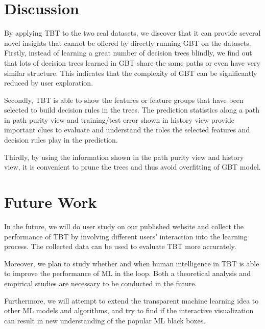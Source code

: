 \documentclass{chi2009}
\begin{document}
\section{Discussion}

By applying TBT to the two real datasets, we discover that it can provide several novel insights that cannot be offered by directly running GBT on the datasets. Firstly, instead of learning a great number of decision trees blindly, we find out that lots of decision trees learned in GBT share the same paths or even have very similar structure. This indicates that the complexity of GBT can be significantly reduced by user exploration.

Secondly, TBT is able to show the features or feature groups that have been selected to build decision rules in the trees. The prediction statistics along a path in path purity view and training/test error shown in history view provide important clues to evaluate and understand the roles the selected features and decision rules play in the prediction. 

Thirdly, by using the information shown in the path purity view and history view, it is convenient to prune the trees and thus avoid overfitting of GBT model.

\section{Future Work}

In the future, we will do user study on our published website and collect the performance of TBT by involving different users' interaction into the learning process. The collected data can be used to evaluate TBT more accurately. 

Moreover, we plan to study whether and when human intelligence in TBT is able to improve the performance of ML in the loop. Both a theoretical analysis and empirical studies are necessary to be conducted in the future.

Furthermore, we will attempt to extend the transparent machine learning idea to other ML models and algorithms, and try to find if the interactive visualization can result in new understanding of the popular ML black boxes.



\end{document}
